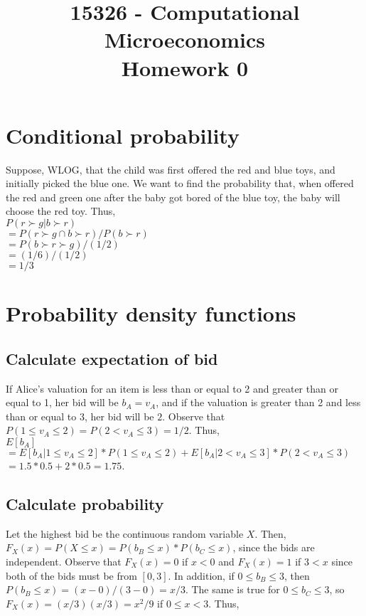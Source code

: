 \documentclass{article}
\title{15326 - Computational Microeconomics\\
Homework 0}
\begin{document}
\maketitle

\section{Conditional probability}

Suppose, WLOG, that the child was first offered the red and blue toys, and initially picked the blue one. We want to find the probability that, when offered the red and green one after the baby got bored of the blue toy, the baby will choose the red toy. Thus, \\
$P(r \succ g | b \succ r) $\\
$= P(r \succ g \cap b \succ r)/P(b \succ r)$\\
$= P(b \succ r \succ g) / (1/2) $\\
$= (1/6) / (1/2) $\\
$= 1/3 $\\


\section{Probability density functions}


\subsection{Calculate expectation of bid}

If Alice's valuation for an item is less than or equal to 2 and greater than or equal to 1, her bid will be $b_A = v_A$, and if the valuation is greater than 2 and less than or equal to 3, her bid will be $2$. Observe that $P(1 \leq v_A \leq 2) = P(2 < v_A \leq 3) = 1/2$. Thus,\\
$E[b_A]$\\
$ = E[b_A | 1 \leq v_A \leq 2] * P(1 \leq v_A \leq 2) + E[b_A | 2 < v_A \leq 3] * P(2 < v_A \leq 3)$\\
$ = 1.5*0.5 + 2*0.5 = 1.75$. 

\subsection{Calculate probability}

Let the highest bid be the continuous random variable $X$. Then, $F_X(x)=P(X\leq x) = P(b_B \leq x) * P(b_C \leq x)$, since  the bids are independent. Observe that $F_X(x)=0$ if $x<0$ and  $F_X(x)=1$ if $3 < x$ since both of the bids must be from $[0,3]$. In addition, if $0 \leq b_B \leq 3$, then $P(b_B \leq x)=(x-0)/(3-0) = x/3$. The same is true for $0 \leq b_C \leq 3$, so $F_X(x)=(x/3)(x/3) = x^2/9$ if $ 0 \leq x < 3$. Thus, 
\end{document}
